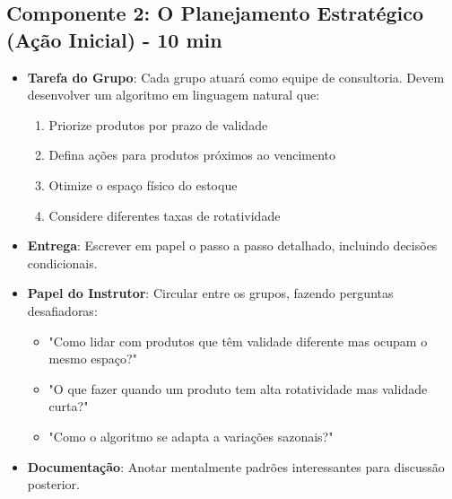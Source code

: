 \documentclass{lesson_plan}
\begin{document}
\subsection{Componente 2: O Planejamento Estratégico (Ação Inicial) - 10 min}
\begin{itemize}
    \item \textbf{Tarefa do Grupo}: Cada grupo atuará como equipe de consultoria. Devem desenvolver um algoritmo em linguagem natural que:
    \begin{enumerate}
        \item Priorize produtos por prazo de validade
        \item Defina ações para produtos próximos ao vencimento
        \item Otimize o espaço físico do estoque
        \item Considere diferentes taxas de rotatividade
    \end{enumerate}
    \item \textbf{Entrega}: Escrever em papel o passo a passo detalhado, incluindo decisões condicionais.
    \item \textbf{Papel do Instrutor}: Circular entre os grupos, fazendo perguntas desafiadoras:
    \begin{itemize}
        \item "Como lidar com produtos que têm validade diferente mas ocupam o mesmo espaço?"
        \item "O que fazer quando um produto tem alta rotatividade mas validade curta?"
        \item "Como o algoritmo se adapta a variações sazonais?"
    \end{itemize}
    \item \textbf{Documentação}: Anotar mentalmente padrões interessantes para discussão posterior.
\end{itemize}

\newpage
\end{document}
